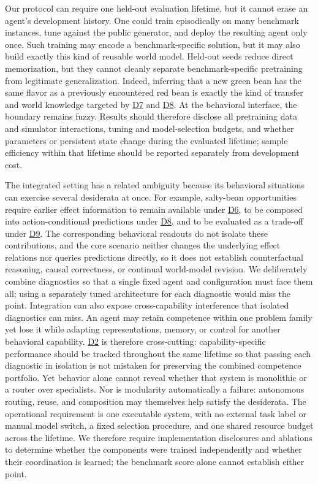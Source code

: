 \documentclass[10pt,journal,compsoc]{IEEEtran}
\DeclareRobustCommand{\Dref}[1]{\hyperref[sec:d#1]{D#1}}
\begin{document}
Our protocol can require one held-out evaluation lifetime, but it cannot erase an agent's development history.
One could train episodically on many benchmark instances, tune against the public generator, and deploy the resulting agent only once.
Such training may encode a benchmark-specific solution, but it may also build exactly this kind of reusable world model.
Held-out seeds reduce direct memorization, but they cannot cleanly separate benchmark-specific pretraining from legitimate generalization.
Indeed, inferring that a new green bean has the same flavor as a previously encountered red bean is exactly the kind of transfer and world knowledge targeted by \Dref{7} and \Dref{8}.
At the behavioral interface, the boundary remains fuzzy.
Results should therefore disclose all pretraining data and simulator interactions, tuning and model-selection budgets, and whether parameters or persistent state change during the evaluated lifetime; sample efficiency within that lifetime should be reported separately from development cost.

The integrated setting has a related ambiguity because its behavioral situations can exercise several desiderata at once.
For example, salty-bean opportunities require earlier effect information to remain available under \Dref{6}, to be composed into action-conditional predictions under \Dref{8}, and to be evaluated as a trade-off under \Dref{9}.
The corresponding behavioral readouts do not isolate these contributions, and the core scenario neither changes the underlying effect relations nor queries predictions directly, so it does not establish counterfactual reasoning, causal correctness, or continual world-model revision.
We deliberately combine diagnostics so that a single fixed agent and configuration must face them all; using a separately tuned architecture for each diagnostic would miss the point.
Integration can also expose cross-capability interference that isolated diagnostics can miss.
An agent may retain competence within one problem family yet lose it while adapting representations, memory, or control for another behavioral capability.
\Dref{2} is therefore cross-cutting: capability-specific performance should be tracked throughout the same lifetime so that passing each diagnostic in isolation is not mistaken for preserving the combined competence portfolio.
Yet behavior alone cannot reveal whether that system is monolithic or a router over specialists.
Nor is modularity automatically a failure: autonomous routing, reuse, and composition may themselves help satisfy the desiderata.
The operational requirement is one executable system, with no external task label or manual model switch, a fixed selection procedure, and one shared resource budget across the lifetime.
We therefore require implementation disclosures and ablations to determine whether the components were trained independently and whether their coordination is learned; the benchmark score alone cannot establish either point.
\end{document}
